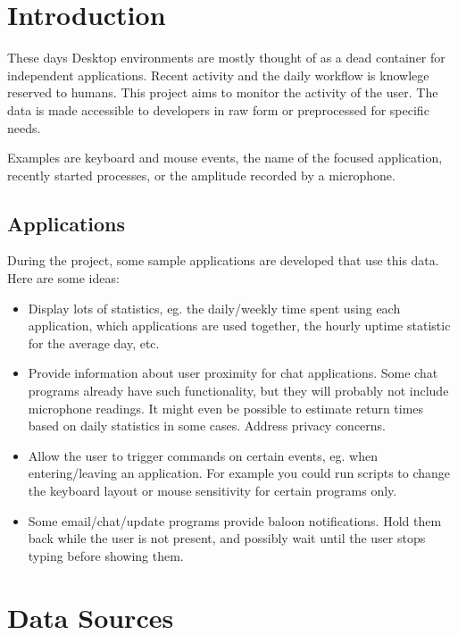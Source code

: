 \documentclass[]{article}
\begin{document}
\maketitle

\section{Introduction}

These days Desktop environments are mostly thought of as a dead
container for independent applications. Recent activity and the daily
workflow is knowlege reserved to humans. This project aims to monitor
the activity of the user. The data is made accessible to developers in
raw form or preprocessed for specific needs.

Examples are keyboard and mouse events, the name of the focused
application, recently started processes, or the amplitude recorded by
a microphone.

\subsection{Applications}
During the project, some sample applications are developed that use
this data. Here are some ideas:
\begin{itemize}
\item
Display lots of statistics, eg. the daily/weekly time spent using each
application, which applications are used together, the hourly uptime
statistic for the average day, etc.
\item
Provide information about user proximity for chat applications. Some
chat programs already have such functionality, but they will probably
not include microphone readings. It might even be possible to estimate
return times based on daily statistics in some cases. Address privacy
concerns.
\item
Allow the user to trigger commands on certain events, eg. when
entering/leaving an application. For example you could run scripts to
change the keyboard layout or mouse sensitivity for certain
programs only.
\item
Some email/chat/update programs provide baloon notifications. Hold
them back while the user is not present, and possibly wait until the
user stops typing before showing them.
\end{itemize}

\section{Data Sources}
\end{document}
